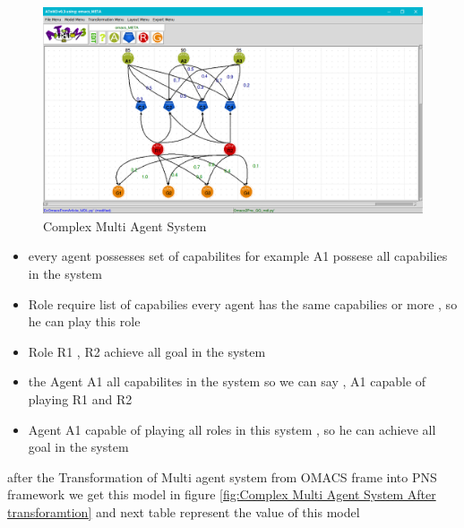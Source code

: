 \begin{figure}[th]
	\centering
 	\includegraphics[scale=0.3]{Chapiter3/img/article}
	\caption{\label{fig:Complex Multi Agent System}Complex Multi Agent System}
\end{figure} 

\begin{itemize}
	\item every agent possesses set of capabilites for example A1 possese all capabilies in the system
	\item Role require list of capabilies every agent has the same capabilies or more , so he can play this role
	\item Role R1 , R2 achieve all goal in the system
	\item the Agent A1 all capabilites in the system so we can say , A1 capable of playing R1 and R2
	\item Agent A1 capable of playing all roles in this system , so he can achieve all goal in the system
\end{itemize}
\vspace{2cm}

after the Transformation of Multi agent system from OMACS frame into PNS framework we get this model in figure \ref{fig:Complex Multi Agent System After transforamtion} 
and next table represent the value of this model 


